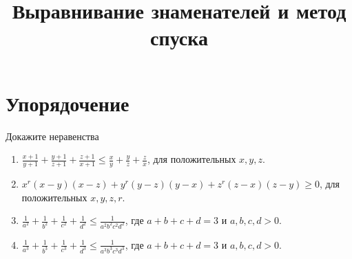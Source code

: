 \documentclass[a4paper,12pt,leqno]{article}
\title{Выравнивание знаменателей и метод спуска}
\date{}
\begin{document}
	
	\maketitle


	\newcommand{\z}{\addtocounter{num}{1}%
	\boxed{\arabic{num}} }

	\newcommand{\hw}{\addtocounter{num}{1}%
	\text{ДЗ }\boxed{\arabic{num}} }

	\section*{Упорядочение}
	Докажите неравенства
	\begin{enumerate}
		\item[\z] $\displaystyle\frac{x+1}{y+1} + \frac{y+1}{z+1} + \frac{z+1}{x+1} \leqslant \frac{x}{y} + \frac{y}{z} + \frac{z}{x}$, для положительных $x, y, z$.
		\item[\hw] $x^r(x-y)(x-z) + y^r(y-z)(y-x) + z^r (z-x)(z-y) \geqslant 0$, для положительных $x, y, z, r$.
		\item[\hw] $\displaystyle\frac{1}{a^2} + \frac{1}{b^2} + \frac{1}{c^2} + \frac{1}{d^2} \leqslant \frac{1}{a^2b^2c^2d^2}$, где $a+b+c+d = 3$ и $a, b, c, d > 0$.
		\item[\hw] $\displaystyle\frac{1}{a^3} + \frac{1}{b^3} + \frac{1}{c^3} + \frac{1}{d^3} \leqslant \frac{1}{a^3b^3c^3d^3}$, где $a+b+c+d = 3$ и $a, b, c, d > 0$.	
	\end{enumerate}
	
\end{document}
